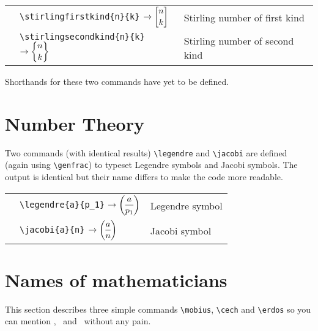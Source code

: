 \documentclass[12pt,a4paper]{article}
\begin{document}
\begin{longtable}[l]{ l l p{6cm} }
&\verb|\stirlingfirstkind{n}{k}| $\displaystyle\rightarrow\stirlingfirstkind{n}{k}$ & Stirling number of first kind\\
&\verb|\stirlingsecondkind{n}{k}| $\displaystyle\rightarrow\stirlingsecondkind{n}{k}$ & Stirling number of second kind\\
\end{longtable}
Shorthands for these two commands have yet to be defined.

\section{Number Theory}
Two commands (with identical results) \verb|\legendre| and \verb|\jacobi| are defined (again using \verb|\genfrac|) to typeset Legendre symbols and Jacobi symbols.
The output is identical but their name differs to make the code more readable.
\begin{longtable}[l]{ l l p{6cm} }
&\verb|\legendre{a}{p_1}| $\displaystyle\rightarrow\legendre{a}{p_1}$ & Legendre symbol\\
&\verb|\jacobi{a}{n}| $\displaystyle\rightarrow\jacobi{a}{n}$ & Jacobi symbol\\
\end{longtable}

\section{Names of mathematicians}
This section describes three simple commands \verb|\mobius|, \verb|\cech| and \verb|\erdos| so you can mention \mobius, \cech\ and \erdos\ without any pain.
\end{document}
